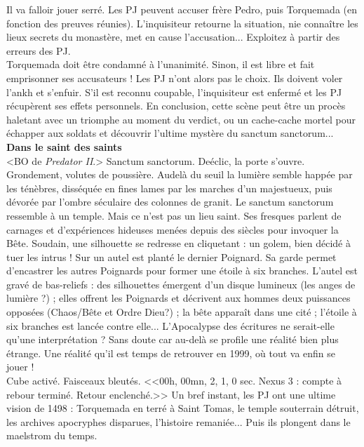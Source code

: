 \documentclass[11pt,twoside,a4paper]{book}
\begin{document}
Il va falloir jouer serr{\'e}. Les PJ peuvent accuser fr{\`e}re Pedro, puis Torquemada (en fonction des preuves r{\'e}unies). L'inquisiteur retourne la situation, nie conna{\^i}tre les lieux secrets du monast{\`e}re, met en cause l'accusation... Exploitez {\`a} partir des erreurs des PJ.~\\

Torquemada doit {\^e}tre condamn{\'e} {\`a} l'unanimit{\'e}. Sinon, il est libre et fait emprisonner ses accusateurs ! Les PJ n'ont alors pas le choix. Ils doivent voler l'ankh et s'enfuir. S'il est reconnu coupable, l'inquisiteur est enferm{\'e} et les PJ r{\'e}cup{\`e}rent ses effets personnels. En conclusion, cette sc{\`e}ne peut {\^e}tre un proc{\`e}s haletant avec un triomphe au moment du verdict, ou un cache-cache mortel pour {\'e}chapper aux soldats et d{\'e}couvrir l'ultime myst{\`e}re du sanctum sanctorum...~\\

\textbf{\large Dans le saint des saints}~\\

<BO de \emph{Predator II}.> Sanctum sanctorum. De{\'e}clic, la porte s'ouvre. Grondement, volutes de poussi{\`e}re. Audel{\`a} du seuil la lumi{\`e}re semble happ{\'e}e par les t{\'e}n{\`e}bres, diss{\'e}qu{\'e}e en fines lames par les marches d'un majestueux, puis d{\'e}vor{\'e}e par l'ombre s{\'e}culaire des colonnes de granit. Le sanctum sanctorum ressemble {\`a} un temple. Mais ce n'est pas un lieu saint. Ses fresques parlent de carnages et d'exp{\'e}riences hideuses men{\'e}es depuis des si{\`e}cles pour invoquer la B{\^e}te. Soudain, une silhouette se redresse en cliquetant : un golem, bien d{\'e}cid{\'e} {\`a} tuer les intrus ! Sur un autel est plant{\'e} le dernier Poignard. Sa garde permet d'encastrer les autres Poignards pour former une {\'e}toile {\`a} six branches. L'autel est grav{\'e} de bas-reliefs : des silhouettes {\'e}mergent d'un disque lumineux (les anges de lumi{\`e}re ?) ; elles offrent les Poignards et d{\'e}crivent aux hommes deux puissances oppos{\'e}es (Chaos/B{\^e}te et Ordre Dieu?) ; la b{\^e}te appara{\^i}t dans une cit{\'e} ; l'{\'e}toile {\`a} six branches est lanc{\'e}e contre elle... L'Apocalypse des {\'e}critures ne serait-elle qu'une interpr{\'e}tation ? Sans doute car au-del{\`a} se profile une r{\'e}alit{\'e} bien plus {\'e}trange. Une r{\'e}alit{\'e} qu'il est temps de retrouver en 1999, o{\`u} tout va enfin se jouer !~\\

Cube activ{\'e}. Faisceaux bleut{\'e}s. <<00h, 00mn, 2, 1, 0 sec. Nexus 3 : compte {\`a} rebour termin{\'e}. Retour enclench{\'e}.>> Un bref instant, les PJ ont une ultime vision de 1498 : Torquemada en terr{\'e} {\`a} Saint Tomas, le temple souterrain d{\'e}truit, les archives apocryphes disparues, l'histoire remani{\'e}e... Puis ils plongent dans le maelstrom du temps.~\\
\end{document}
